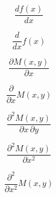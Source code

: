 \documentclass{article}
\begin{document}
\begin{equation} \label{eq_002}
    \frac{df(x)}{dx}
\end{equation}

\begin{equation} \label{eq_003}
    \frac{d}{dx} f(x)
\end{equation}

\begin{equation} \label{eq_004}
    \frac{\partial M(x,y)}{\partial x}
\end{equation}

\begin{equation} \label{eq_005}
    \frac{\partial}{\partial x} M(x,y)
\end{equation}

\begin{equation} \label{eq_006}
    \frac{\partial^2 M(x,y)}{\partial x \, \partial y}
\end{equation}

\begin{equation} \label{eq_007}
    \frac{\partial^2 M(x,y)}{\partial x^2}
\end{equation}

\begin{equation} \label{eq_008}
    \frac{\partial^2}{\partial x^2} M(x,y)
\end{equation}
\end{document}
